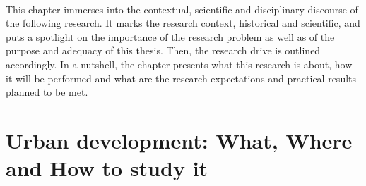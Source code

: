 \documentclass[11pt]{report}
\begin{document}
\\
This chapter immerses into the contextual, scientific and disciplinary discourse of the following research. It marks the research context, historical and scientific, and puts a spotlight on the importance of the research problem as well as of the purpose and adequacy of this thesis. Then, the research drive is outlined accordingly. In a nutshell, the chapter presents what this research is about, how it will be performed and what are the research expectations and practical results planned to be met. 

\section{Urban development: What, Where and How to study it}
\end{document}
